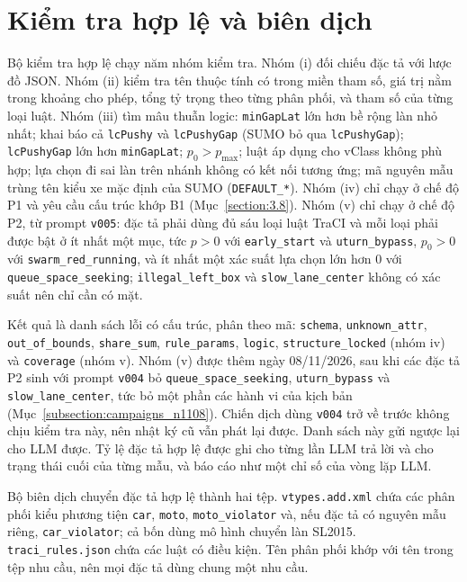 \documentclass[../main.tex]{subfiles}
\begin{document}
\section{Kiểm tra hợp lệ và biên dịch}
\label{section:3.4}

Bộ kiểm tra hợp lệ chạy năm nhóm kiểm tra. Nhóm (i) đối chiếu đặc tả với lược đồ JSON. Nhóm (ii) kiểm tra tên thuộc tính có trong miền tham số, giá trị nằm trong khoảng cho phép, tổng tỷ trọng theo từng phân phối, và tham số của từng loại luật. Nhóm (iii) tìm mâu thuẫn logic: \texttt{minGapLat} lớn hơn bề rộng làn nhỏ nhất; khai báo cả \texttt{lcPushy} và \texttt{lcPushyGap} (SUMO bỏ qua \texttt{lcPushyGap}); \texttt{lcPushyGap} lớn hơn \texttt{minGapLat}; $p_0 > p_{\max}$; luật áp dụng cho vClass không phù hợp; lựa chọn đi sai làn trên nhánh không có kết nối tương ứng; mã nguyên mẫu trùng tên kiểu xe mặc định của SUMO (\texttt{DEFAULT\_*}). Nhóm (iv) chỉ chạy ở chế độ P1 và yêu cầu cấu trúc khớp B1 (Mục~\ref{section:3.8}). Nhóm (v) chỉ chạy ở chế độ P2, từ prompt \texttt{v005}: đặc tả phải dùng đủ sáu loại luật TraCI và mỗi loại phải được bật ở ít nhất một mục, tức $p > 0$ với \texttt{early\_start} và \texttt{uturn\_bypass}, $p_0 > 0$ với \texttt{swarm\_red\_running}, và ít nhất một xác suất lựa chọn lớn hơn 0 với \texttt{queue\_space\_seeking}; \texttt{illegal\_left\_box} và \texttt{slow\_lane\_center} không có xác suất nên chỉ cần có mặt.

Kết quả là danh sách lỗi có cấu trúc, phân theo mã: \texttt{schema}, \texttt{unknown\_attr}, \texttt{out\_of\_bounds}, \texttt{share\_sum}, \texttt{rule\_params}, \texttt{logic}, \texttt{structure\_locked} (nhóm iv) và \texttt{coverage} (nhóm v). Nhóm (v) được thêm ngày 08/11/2026, sau khi các đặc tả P2 sinh với prompt \texttt{v004} bỏ \texttt{queue\_space\_seeking}, \texttt{uturn\_bypass} và \texttt{slow\_lane\_center}, tức bỏ một phần các hành vi của kịch bản (Mục~\ref{subsection:campaigns_n1108}). Chiến dịch dùng \texttt{v004} trở về trước không chịu kiểm tra này, nên nhật ký cũ vẫn phát lại được. Danh sách này gửi ngược lại cho LLM được. Tỷ lệ đặc tả hợp lệ được ghi cho từng lần LLM trả lời và cho trạng thái cuối của từng mẫu, và báo cáo như một chỉ số của vòng lặp LLM.

Bộ biên dịch chuyển đặc tả hợp lệ thành hai tệp. \texttt{vtypes.add.xml} chứa các phân phối kiểu phương tiện \texttt{car}, \texttt{moto}, \texttt{moto\_violator} và, nếu đặc tả có nguyên mẫu riêng, \texttt{car\_violator}; cả bốn dùng mô hình chuyển làn SL2015. \texttt{traci\_rules.json} chứa các luật có điều kiện. Tên phân phối khớp với tên trong tệp nhu cầu, nên mọi đặc tả dùng chung một nhu cầu.
\end{document}

